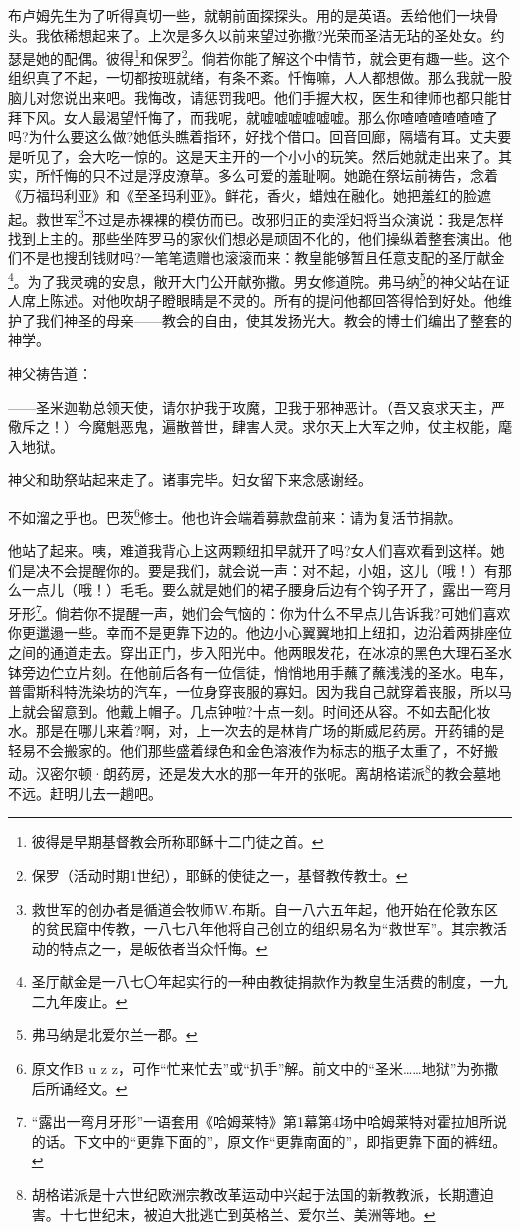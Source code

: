 \par 布卢姆先生为了听得真切一些，就朝前面探探头。用的是英语。丢给他们一块骨头。我依稀想起来了。上次是多久以前来望过弥撒?光荣而圣洁无玷的圣处女。约瑟是她的配偶。彼得\footnote{彼得是早期基督教会所称耶稣十二门徒之首。}和保罗\footnote{保罗（活动时期1世纪），耶稣的使徒之一，基督教传教士。}。倘若你能了解这个中情节，就会更有趣一些。这个组织真了不起，一切都按班就绪，有条不紊。忏悔嘛，人人都想做。那么我就一股脑儿对您说出来吧。我悔改，请惩罚我吧。他们手握大权，医生和律师也都只能甘拜下风。女人最渴望忏悔了，而我呢，就嘘嘘嘘嘘嘘嘘。那么你喳喳喳喳喳喳了吗?为什么要这么做?她低头瞧着指环，好找个借口。回音回廊，隔墙有耳。丈夫要是听见了，会大吃一惊的。这是天主开的一个小小的玩笑。然后她就走出来了。其实，所忏悔的只不过是浮皮潦草。多么可爱的羞耻啊。她跪在祭坛前祷告，念着《万福玛利亚》和《至圣玛利亚》。鲜花，香火，蜡烛在融化。她把羞红的脸遮起。救世军\footnote{救世军的创办者是循道会牧师W.布斯。自一八六五年起，他开始在伦敦东区的贫民窟中传教，一八七八年他将自己创立的组织易名为“救世军”。其宗教活动的特点之一，是皈依者当众忏悔。}不过是赤裸裸的模仿而已。改邪归正的卖淫妇将当众演说：我是怎样找到上主的。那些坐阵罗马的家伙们想必是顽固不化的，他们操纵着整套演出。他们不是也搜刮钱财吗?一笔笔遗赠也滚滚而来：教皇能够暂且任意支配的圣厅献金\footnote{圣厅献金是一八七〇年起实行的一种由教徒捐款作为教皇生活费的制度，一九二九年废止。}。为了我灵魂的安息，敞开大门公开献弥撒。男女修道院。弗马纳\footnote{弗马纳是北爱尔兰一郡。}的神父站在证人席上陈述。对他吹胡子瞪眼睛是不灵的。所有的提问他都回答得恰到好处。他维护了我们神圣的母亲——教会的自由，使其发扬光大。教会的博士们编出了整套的神学。
\par 神父祷告道：
\par ——圣米迦勒总领天使，请尔护我于攻魔，卫我于邪神恶计。（吾又哀求天主，严儆斥之！）今魔魁恶鬼，遍散普世，肆害人灵。求尔天上大军之帅，仗主权能，麾入地狱。
\par 神父和助祭站起来走了。诸事完毕。妇女留下来念感谢经。
\par 不如溜之乎也。巴茨\footnote{原文作B u z z，可作“忙来忙去”或“扒手”解。前文中的“圣米……地狱”为弥撒后所诵经文。}修士。他也许会端着募款盘前来：请为复活节捐款。
\par 他站了起来。咦，难道我背心上这两颗纽扣早就开了吗?女人们喜欢看到这样。她们是决不会提醒你的。要是我们，就会说一声：对不起，小姐，这儿（哦！）有那么一点儿（哦！）毛毛。要么就是她们的裙子腰身后边有个钩子开了，露出一弯月牙形\footnote{“露出一弯月牙形”一语套用《哈姆莱特》第1幕第4场中哈姆莱特对霍拉旭所说的话。下文中的“更靠下面的”，原文作“更靠南面的”，即指更靠下面的裤纽。}。倘若你不提醒一声，她们会气恼的：你为什么不早点儿告诉我?可她们喜欢你更邋遢一些。幸而不是更靠下边的。他边小心翼翼地扣上纽扣，边沿着两排座位之间的通道走去。穿出正门，步入阳光中。他两眼发花，在冰凉的黑色大理石圣水钵旁边伫立片刻。在他前后各有一位信徒，悄悄地用手蘸了蘸浅浅的圣水。电车，普雷斯科特洗染坊的汽车，一位身穿丧服的寡妇。因为我自己就穿着丧服，所以马上就会留意到。他戴上帽子。几点钟啦?十点一刻。时间还从容。不如去配化妆水。那是在哪儿来着?啊，对，上一次去的是林肯广场的斯威尼药房。开药铺的是轻易不会搬家的。他们那些盛着绿色和金色溶液作为标志的瓶子太重了，不好搬动。汉密尔顿·朗药房，还是发大水的那一年开的张呢。离胡格诺派\footnote{胡格诺派是十六世纪欧洲宗教改革运动中兴起于法国的新教教派，长期遭迫害。十七世纪末，被迫大批逃亡到英格兰、爱尔兰、美洲等地。}的教会墓地不远。赶明儿去一趟吧。
